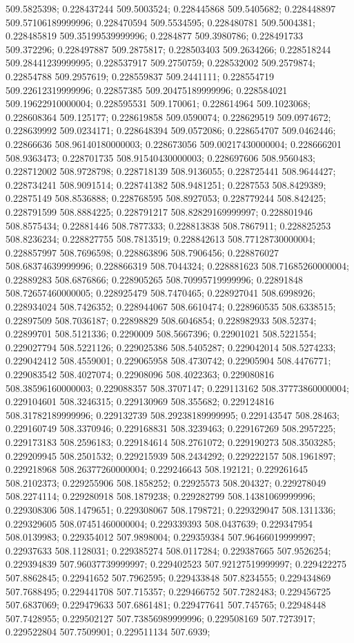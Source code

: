 509.5825398; 0.228437244 509.5003524; 0.228445868 509.5405682; 0.228448897 509.57106189999996; 0.228470594 509.5534595; 0.228480781 509.5004381; 0.228485819 509.35199539999996; 0.2284877 509.3980786; 0.228491733 509.372296; 0.228497887 509.2875817; 0.228503403 509.2634266; 0.228518244 509.28441239999995; 0.228537917 509.2750759; 0.228532002 509.2579874; 0.22854788 509.2957619; 0.228559837 509.2441111; 0.228554719 509.22612319999996; 0.22857385 509.20475189999996; 0.228584021 509.19622910000004; 0.228595531 509.170061; 0.228614964 509.1023068; 0.228608364 509.125177; 0.228619858 509.0590074; 0.228629519 509.0974672; 0.228639992 509.0234171; 0.228648394 509.0572086; 0.228654707 509.0462446; 0.22866636 508.96140180000003; 0.228673056 509.00217430000004; 0.228666201 508.9363473; 0.228701735 508.91540430000003; 0.228697606 508.9560483; 0.228712002 508.9728798; 0.228718139 508.9136055; 0.228725441 508.9644427; 0.228734241 508.9091514; 0.228741382 508.9481251; 0.2287553 508.8429389; 0.22875149 508.8536888; 0.228768595 508.8927053; 0.228779244 508.842425; 0.228791599 508.8884225; 0.228791217 508.82829169999997; 0.228801946 508.8575434; 0.22881446 508.7877333; 0.228813838 508.7867911; 0.228825253 508.8236234; 0.228827755 508.7813519; 0.228842613 508.77128730000004; 0.228857997 508.7696598; 0.228863896 508.7906456; 0.228876027 508.68374639999996; 0.228866319 508.7044324; 0.228881623 508.71685260000004; 0.22889283 508.6876866; 0.228905265 508.70995719999996; 0.22891848 508.72657460000005; 0.228925479 508.7470465; 0.228927041 508.6998926; 0.228934024 508.7426352; 0.228944067 508.6610474; 0.228960535 508.6338515; 0.22897509 508.7036187; 0.22898829 508.6046854; 0.228982933 508.52374; 0.22899701 508.5121336; 0.2290009 508.5667396; 0.22901021 508.5221554; 0.229027794 508.5221126; 0.229025386 508.5405287; 0.229042014 508.5274233; 0.229042412 508.4559001; 0.229065958 508.4730742; 0.22905904 508.4476771; 0.229083542 508.4027074; 0.22908096 508.4022363; 0.229080816 508.38596160000003; 0.229088357 508.3707147; 0.229113162 508.37773860000004; 0.229104601 508.3246315; 0.229130969 508.355682; 0.229124816 508.31782189999996; 0.229132739 508.29238189999995; 0.229143547 508.28463; 0.229160749 508.3370946; 0.229168831 508.3239463; 0.229167269 508.2957225; 0.229173183 508.2596183; 0.229184614 508.2761072; 0.229190273 508.3503285; 0.229209945 508.2501532; 0.229215939 508.2434292; 0.229222157 508.1961897; 0.229218968 508.26377260000004; 0.229246643 508.192121; 0.229261645 508.2102373; 0.229255906 508.1858252; 0.22925573 508.204327; 0.229278049 508.2274114; 0.229280918 508.1879238; 0.229282799 508.14381069999996; 0.229308306 508.1479651; 0.229308067 508.1798721; 0.229329047 508.1311336; 0.229329605 508.07451460000004; 0.229339393 508.0437639; 0.229347954 508.0139983; 0.229354012 507.9898004; 0.229359384 507.96466019999997; 0.22937633 508.1128031; 0.229385274 508.0117284; 0.229387665 507.9526254; 0.229394839 507.96037739999997; 0.229402523 507.92127519999997; 0.229422275 507.8862845; 0.22941652 507.7962595; 0.229433848 507.8234555; 0.229434869 507.7688495; 0.229441708 507.715357; 0.229466752 507.7282483; 0.229456725 507.6837069; 0.229479633 507.6861481; 0.229477641 507.745765; 0.22948448 507.7428955; 0.229502127 507.73856989999996; 0.229508169 507.7273917; 0.229522804 507.7509901; 0.229511134 507.6939; 